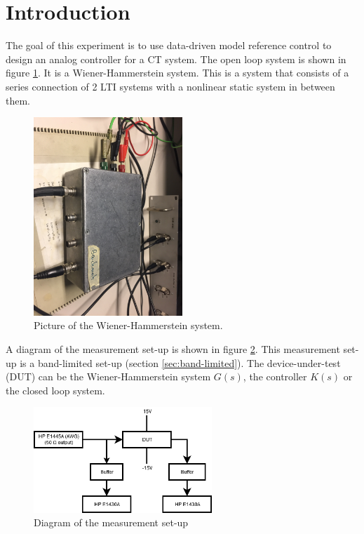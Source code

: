 
\section{Introduction}
The goal of this experiment is to use data-driven model reference control to design an analog controller for a CT system. The open loop system is shown in figure \ref{fig:WH_OL}. It is a Wiener-Hammerstein system. This is a system that consists of a series connection of 2 LTI systems with a nonlinear static system in between them.

\begin{figure}[H]
    \centering
    \includegraphics[width = 0.5\textwidth]{figures/DUT.jpg}
    \caption{Picture of the Wiener-Hammerstein system.}
    \label{fig:WH_OL}
\end{figure}


A diagram of the measurement set-up is shown in figure \ref{fig:set-up}. This measurement set-up is a band-limited set-up (section \ref{sec:band-limited}). The device-under-test (DUT) can be the Wiener-Hammerstein system $G(s)$, the controller $K(s)$ or the closed loop system.

\begin{figure}[H]
    \centering
    \includegraphics[width = 0.6\textwidth]{figures/DUT_setup.png}
    \caption{Diagram of the measurement set-up}
    \label{fig:set-up}
\end{figure}


